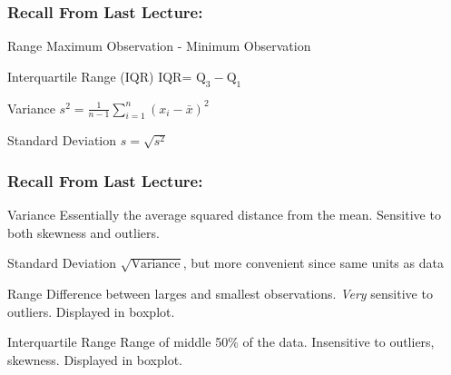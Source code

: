 \documentclass[handout]{beamer}
\date{Lecture \# 3}
\begin{document}
 





\begin{frame}[plain]
	\titlepage 
	

\end{frame} 

\begin{frame}
\frametitle{Recall From Last Lecture: }

\begin{block}{Range}
Maximum Observation - Minimum Observation
\end{block}

\begin{block}{Interquartile Range (IQR)}
IQR= $\mbox{Q}_3 - \mbox{Q}_1$
\end{block}

\begin{block}{Variance}
$\displaystyle s^2 = \frac{1}{n-1} \sum_{i=1}^n (x_i - \bar{x})^2$
\end{block}

 \begin{block}{Standard Deviation}
	$s = \sqrt{s^2}$
\end{block}
\end{frame}

\begin{frame}
\frametitle{Recall From Last Lecture:}
\begin{block}{Variance}
Essentially the average squared distance from the mean. Sensitive to both skewness and outliers.
\end{block}

\begin{block}{Standard Deviation}
$\sqrt{\mbox{Variance}}$, but more convenient since \alert{same units as data}
\end{block}

\begin{block}{Range}
Difference between larges and smallest observations. \emph{Very} sensitive to outliers. Displayed in boxplot.
\end{block}

\begin{block}{Interquartile Range}
Range of middle 50\% of the data. Insensitive to outliers, skewness. Displayed in boxplot.
\end{block}

\end{frame}
\end{document}
